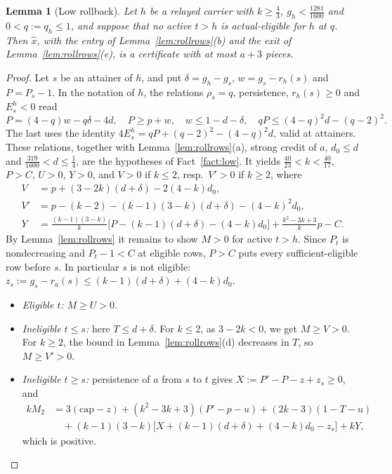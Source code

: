 \documentclass[11pt,a4paper]{article}
\numberwithin{equation}{section}
\newtheorem{lemma}[theorem]{Lemma}
\theoremstyle{definition}
\newcommand{\kcap}{\mathrm{cap}}
\begin{document}
\begin{lemma}[Low rollback]\label{lem:lowroll}Let $h$ be a relayed carrier with $k\ge\frac43$, $g_h<\frac{1281}{1600}$ and
$0<q:=q_h\le1$, and suppose that no active $t>h$ is actual-eligible for $h$ at
$q$. Then $\hat x$, with the entry of Lemma~\ref{lem:rollrows}(b) and the exit
of Lemma~\ref{lem:rollrows}(e), is a certificate with at most $a+3$ pieces.
\end{lemma}

\begin{proof}
Let $s$ be an attainer of $h$, and put $\delta=g_h-g_s$, $w=g_s-r_h(s)$ and
$P=P_s-1$. In the notation of $h$, the relations $\rho_s=q$, persistence,
$r_h(s)\ge0$ and $E^h_s<0$ read
\[
P=(4-q)w-q\delta-4d,\quad P\ge p+w,\quad w\le1-d-\delta,\quad
qP\le(4-q)^2d-(q-2)^2 .
\]
The last uses the identity $4E^h_s=qP+(q-2)^2-(4-q)^2d$, valid at attainers.
These relations, together with Lemma~\ref{lem:rollrows}(a), strong credit of
$a$, $d_0\le d$ and $\frac{319}{1600}<d\le\frac14$, are the hypotheses of
Fact~\ref{fact:low}. It yields $\frac{40}{23}<k<\frac{40}{17}$, $P>C$, $U>0$,
$Y>0$, and $V>0$ if $k\le2$, resp.\ $V'>0$ if $k\ge2$, where
\begin{align*}
V&=p+(3-2k)(d+\delta)-2(4-k)d_0,\\
V'&=p-(k-2)-(k-1)(3-k)(d+\delta)-(4-k)^2d_0,\\
Y&=\frac{(k-1)(3-k)}k\bigl[P-(k-1)(d+\delta)-(4-k)d_0\bigr]+\frac{k^2-3k+3}kp-C.
\end{align*}
By Lemma~\ref{lem:rollrows} it remains to show $M>0$ for active $t>h$. Since
$P_t$ is nondecreasing and $P_t-1<C$ at eligible rows, $P>C$ puts every
sufficient-eligible row before $s$. In particular $s$ is not eligible:
$z_s:=g_s-r_a(s)\le(k-1)(d+\delta)+(4-k)d_0$.
\begin{itemize}
\item \emph{Eligible $t$:} $M\ge U>0$.
\item \emph{Ineligible $t\le s$:} here $T\le d+\delta$. For $k\le2$, as
$3-2k<0$, we get $M\ge V>0$. For $k\ge2$, the bound in
Lemma~\ref{lem:rollrows}(d) decreases in $T$, so $M\ge V'>0$.
\item \emph{Ineligible $t\ge s$:} persistence of $a$ from $s$ to $t$ gives
$X:=P'-P-z+z_s\ge0$, and
\begin{align*}
kM_2&=3(\kcap-z)+(k^2-3k+3)(P'-p-u)+(2k-3)(1-T-u)\\
&\quad+(k-1)(3-k)\bigl[X+(k-1)(d+\delta)+(4-k)d_0-z_s\bigr]+kY,
\end{align*}
which is positive. \qedhere
\end{itemize}
\end{proof}
\end{document}
